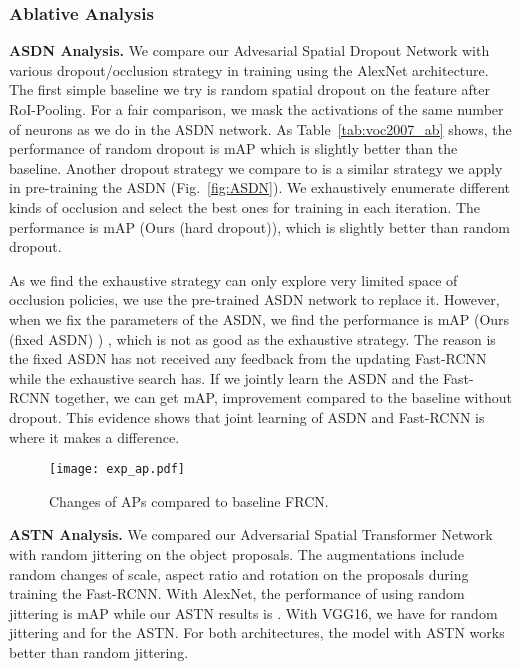 \documentclass[10pt,twocolumn,letterpaper]{article}
\begin{document}
\subsubsection{Ablative Analysis} 
\vspace{-0.05in}
\textbf{ASDN Analysis.} We compare  our Advesarial Spatial Dropout Network with various dropout/occlusion strategy in training using the AlexNet architecture. The first simple baseline we try is random spatial dropout on the feature after RoI-Pooling. For a fair comparison, we mask the activations of the same number of neurons as we do in the ASDN network. As Table~\ref{tab:voc2007_ab} shows, the performance of random dropout is  mAP which is slightly better than the baseline. Another dropout strategy we compare to is a similar strategy we apply in pre-training the ASDN (Fig.~\ref{fig:ASDN}). We exhaustively enumerate different kinds of occlusion and select the best ones for training in each iteration. The performance is  mAP (Ours (hard dropout)), which is slightly better than random dropout. 

As we find the exhaustive strategy can only explore very limited space of occlusion policies, we use the pre-trained ASDN network to replace it. However, when we fix the parameters of the ASDN, we find the performance is  mAP (Ours (fixed ASDN) ) , which is not as good as the exhaustive strategy. The reason is the fixed ASDN has not received any feedback from the updating Fast-RCNN while the exhaustive search has.  If we jointly learn the ASDN and the Fast-RCNN together, we can get  mAP,  improvement compared to the baseline without dropout. This evidence shows that joint learning of ASDN and Fast-RCNN is where it makes a difference. 

\begin{figure}
    \centering
    \texttt{[image: exp\_ap.pdf]}
    \vspace{-0.1in}
    \caption{Changes of APs compared to baseline FRCN.}\label{fig:exp_ap}
    \vspace{-0.1in}
\end{figure}
\textbf{ASTN Analysis.} We compared our Adversarial Spatial Transformer Network with random jittering on the object proposals. The augmentations include random changes of scale, aspect ratio and rotation on the proposals during training the Fast-RCNN. With AlexNet, the performance of using random jittering is  mAP while our ASTN results is . With VGG16, we have  for random jittering and  for the ASTN. For both architectures, the model with ASTN works better than random jittering. 
\end{document}
